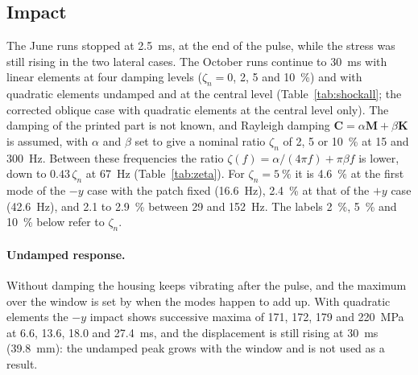 \documentclass[11pt]{article}
\begin{document}
\subsection{Impact}

The June runs stopped at \SI{2.5}{ms}, at the end of the pulse, while the stress was still rising in the two lateral
cases. The October runs continue to \SI{30}{ms} with linear elements at four damping levels ($\zeta_n=0$, 2, 5 and
\SI{10}{\%}) and with quadratic elements
undamped and at the central level (Table~\ref{tab:shockall}; the corrected oblique case with quadratic elements at the
central level only). The damping of the printed part is not known, and Rayleigh damping
$\mathbf{C}=\alpha\mathbf{M}+\beta\mathbf{K}$ is assumed, with $\alpha$ and $\beta$ set to give a nominal ratio
$\zeta_n$ of 2, 5 or \SI{10}{\%} at 15 and \SI{300}{Hz}. Between these frequencies the ratio
$\zeta(f)=\alpha/(4\pi f)+\pi\beta f$ is lower, down to $0.43\,\zeta_n$ at \SI{67}{Hz} (Table~\ref{tab:zeta}). For
$\zeta_n=\SI{5}{\%}$ it is \SI{4.6}{\%} at the first mode of the $-y$ case with the patch fixed (\SI{16.6}{Hz}),
\SI{2.4}{\%} at that of the $+y$ case (\SI{42.6}{Hz}), and 2.1 to \SI{2.9}{\%} between 29 and \SI{152}{Hz}. The labels
\SI{2}{\%}, \SI{5}{\%} and \SI{10}{\%} below refer to $\zeta_n$.

\begin{table}[h]
\centering
\caption{Damping ratio of the Rayleigh model, $\zeta(f)$, for the three nominal levels $\zeta_n$ (reached at 15 and
\SI{300}{Hz}). Patch-fixed modes: linear elements.}
\label{tab:zeta}
\small

\end{table}

\begin{table}[h]
\centering
\caption{Impact peaks over \SIrange{0}{30}{ms}: von Mises stress $\sigma$ (MPa) more than \SI{8}{mm} from the contact
plane, time of the peak $t$ (ms) and height $z$ (mm) of the peak element, for linear (TETRA4) and quadratic (TETRA10)
elements and nominal Rayleigh ratio $\zeta_n$ (Table~\ref{tab:zeta}). Undamped peaks depend on the length of the
window (see text).}
\label{tab:shockall}
\small
\setlength{\tabcolsep}{4pt}

\end{table}

\paragraph{Undamped response.} Without damping the housing keeps vibrating after the pulse, and the maximum over the
window is set by when the modes happen to add up. With quadratic elements the $-y$ impact shows successive maxima of
171, 172, 179 and \SI{220}{MPa} at 6.6, 13.6, 18.0 and \SI{27.4}{ms}, and the displacement is still rising at \SI{30}{ms}
(\SI{39.8}{mm}): the undamped peak grows with the window and is not used as a result.
\end{document}
